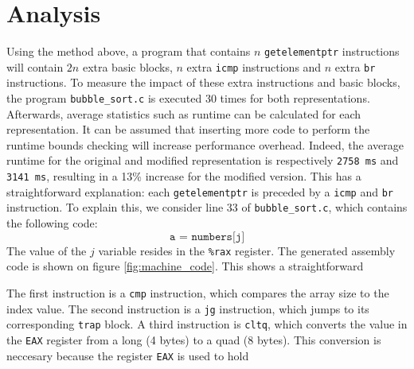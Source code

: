 \documentclass{article}
\begin{document}
	\section{Analysis}
	Using the method above, a program that contains $n$ \texttt{getelementptr} instructions will contain $2n$ extra basic blocks, $n$ extra \texttt{icmp} instructions and $n$ extra \texttt{br} instructions. To measure the impact of these extra instructions and basic blocks, the program \texttt{bubble\_sort.c} is executed 30 times for both representations. Afterwards, average statistics such as runtime can be calculated for each representation. It can be assumed that inserting more code to perform the runtime bounds checking will increase performance overhead. Indeed, the average runtime for the original and modified representation is respectively \texttt{2758 ms} and \texttt{3141 ms}, resulting in a 13\% increase for the modified version. This has a straightforward explanation: each \texttt{getelementptr} is preceded by a \texttt{icmp} and \texttt{br} instruction. To explain this, we consider line 33 of \texttt{bubble\_sort.c}, which contains the following code:
	$$\texttt{a = numbers[j]}$$
	The value of the $j$ variable resides in the \texttt{\%rax} register. The generated assembly code is shown on figure \ref{fig:machine_code}. This shows a straightforward
	
	
	
	The first instruction is a \texttt{cmp} instruction, which compares the array size to the index value. The second instruction is a \texttt{jg} instruction, which jumps to its corresponding \texttt{trap} block. A third instruction is \texttt{cltq}, which converts the value in the \texttt{EAX} register from a long (4 bytes) to a quad (8 bytes). This conversion is neccesary because the register \texttt{EAX} is used to hold 
	
\end{document}
